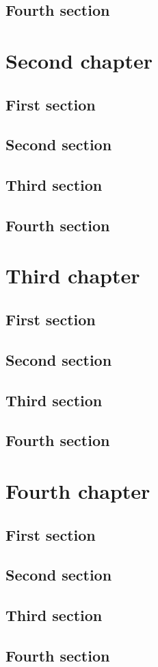 \documentclass{researchbook}
\theoremstyle{plain}
\theoremstyle{definition}
\theoremstyle{remark}
\begin{document}
\section{Fourth section}\lipsum


\chapter{Second chapter}

\section{First section}\lipsum
\section{Second section}\lipsum
\section{Third section}\lipsum
\section{Fourth section}\lipsum


\chapter{Third chapter}

\section{First section}\lipsum
\section{Second section}\lipsum
\section{Third section}\lipsum
\section{Fourth section}\lipsum


\chapter{Fourth chapter}

\section{First section}\lipsum
\section{Second section}\lipsum
\section{Third section}\lipsum
\section{Fourth section}\lipsum
\end{document}
